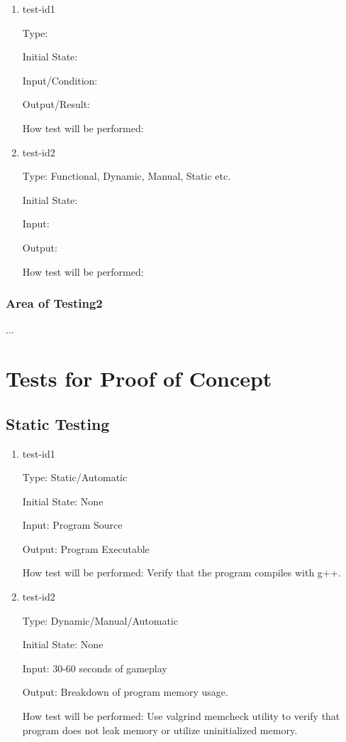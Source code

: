 \documentclass[12pt, titlepage]{article}
\begin{document}
		\begin{enumerate}

			\item{test-id1\\}

			Type: 
								
			Initial State: 
								
			Input/Condition: 
								
			Output/Result: 
								
			How test will be performed: 
								
			\item{test-id2\\}

			Type: Functional, Dynamic, Manual, Static etc.
								
			Initial State: 
								
			Input: 
								
			Output: 
								
			How test will be performed: 

		\end{enumerate}

	\subsubsection{Area of Testing2}
	...

\newpage
\section{Tests for Proof of Concept}

	\subsection{Static Testing}

		\begin{enumerate}

		\item{test-id1\\}

		Type: Static/Automatic
							
		Initial State: None
							
		Input: Program Source
							
		Output: Program Executable
							
		How test will be performed: Verify that the program compiles with g++.
							
		\item{test-id2\\}

		Type: Dynamic/Manual/Automatic
							
		Initial State: None
							
		Input: 30-60 seconds of gameplay
							
		Output: Breakdown of program memory usage.
							
		How test will be performed: Use valgrind memcheck utility to verify that program does not leak memory or utilize uninitialized memory.

		\end{enumerate}
\end{document}
